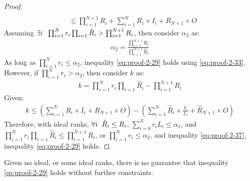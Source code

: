 \documentclass{article}
\begin{document}
\begin{proof}
\begin{align}
		\nonumber\\
		&\leq
		\prod_{i=1}^{N+1}R_i + \sum_{i=1}^{N} R_i\times I_i + R_{N+1}\times O
	\end{align}
Assuming $\exists i\hspace{2mm}\prod_{i=1}^{N}r_i \prod_{i=1}\hat{R}_i > 
\prod_{i=1}^{N+1}R_i$, then consider $\alpha_2$ as:
\begin{align}
	\label{eq:proof-2-35}
	\alpha_2 = \frac{\prod_{i=1}^{N+1}R_i}{\prod_{i=1}^{N+1}\hat{R}_i}
\end{align}
As long as $\prod_{i=1}^{N}r_i \leq \alpha_2$, inequality \ref{eq:proof-2-29} holds using \ref{eq:proof-2-33}. However, if $\prod_{i=1}^{N}r_i > \alpha_2$, then consider $k$ as:
\begin{align}
	\label{eq:proof-2-36}
	k = \prod_{i=1}^{N}r_i \prod_{i=1}\hat{R}_i - \prod_{i=1}^{N+1}R_i
\end{align}
Given:
\begin{align}
	\label{eq:proof-2-37}
	k \leq \left(\sum_{i=1}^{N} R_i\times I_i + R_{N+1}\times O \right) - \left(\sum_{i=1}^{N} \hat{R}_i \times \frac{I_i}{L_i} + \hat{R}_{N+1}\times O\right)
\end{align}
Therefore, with ideal ranks, $\forall i \hspace{2mm}\hat{R}_i \leq R_i$, $\sum_{i=0}^{N} r_iL_i \leq \alpha_1$, and $\prod_{i=1}^{N}r_i \prod_{i=1}\hat{R}_i\leq
\prod_{i=1}^{N+1}R_i$, or $\prod_{i=1}^{N}r_i \leq \alpha_2$, and inequality \ref{eq:proof-2-37},  inequality \ref{eq:proof-2-29} holds.
\end{proof}

Given no ideal, or some ideal ranks, there is no guarantee that inequality \ref{eq:proof-2-29} holds without further constraints. 
\end{document}

